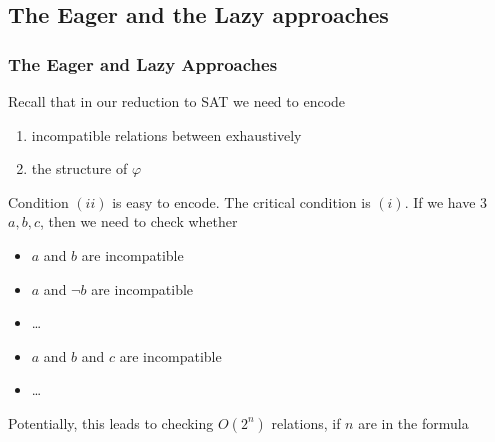 \subsection{The Eager and the Lazy approaches}

\begin{frame}
  \frametitle{The Eager and Lazy Approaches}

  Recall that in our reduction to SAT we need to encode
  \begin{enumerate}[$(i)$]
    \item incompatible relations between \tatoms exhaustively 
    \item the structure of $\varphi$
  \end{enumerate} 
  \pause
  \vfill
  Condition $(ii)$ is easy to encode. The critical condition is $(i)$. 
  If we have 3 \tatoms $a, b, c$, then we need to check whether
  \begin{itemize}
    \item $a$ and $b$ are incompatible 
    \item $a$ and $\neg b$ are incompatible 
    \item \ldots
    \item $a$ and $b$ and $c$ are incompatible 
    \item \ldots
  \end{itemize} 
  \pause
  \vfill
  Potentially, this leads to checking $O(2^n)$ relations, if $n$
  \tatoms are in the formula

\end{frame}

